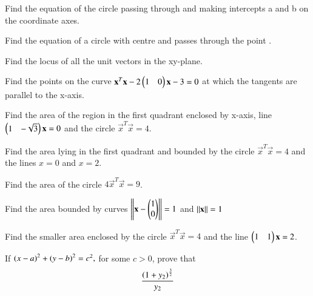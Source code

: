 
\item Find the equation of the circle passing through  and making intercepts a and b on the coordinate axes.
\\
\solution

%
\item Find the equation of a circle with centre  and passes through the point . 
\\
\solution

\item Find the locus of all the unit vectors in the xy-plane.
%
\item Find the points on the curve $\mathbf{x}^T\mathbf{x}-2\begin{pmatrix}1 & 0\end{pmatrix}\mathbf{x} -3 =0$  at which the tangents are parallel to the x-axis.
%
\item  Find the area of the region in the first quadrant enclosed by x-axis, line $\begin{pmatrix}1 & -\sqrt{3}\end{pmatrix}\mathbf{x} =0$ and the circle $\vec{x}^T\vec{x}=4$.
%
\item Find the area lying in the first quadrant and bounded by the circle $\vec{x}^T\vec{x}=4$ and the lines $x = 0$ and $x = 2$.
%
\item Find the area of the circle $4\vec{x}^T\vec{x}=9$.
\item  Find the area bounded by curves $\left\lVert\mathbf{x}-\begin{pmatrix}1\\0\end{pmatrix}\right\rVert = 1$ and $\left\lVert\mathbf{x}\right\rVert=1$
\item Find the smaller area enclosed by the circle $\vec{x}^T\vec{x}=4$ and the line $\begin{pmatrix}1 & 1\end{pmatrix}\mathbf{x} = 2$.
%
\item If 
$
\left(x-a\right)^2+\left(y-b\right)^2 = c^2,
$
for some $c > 0$, prove that 
\begin{align}
\frac{\left(1+y_2\right)^\frac{3}{2}}{y_2}
\end{align}
